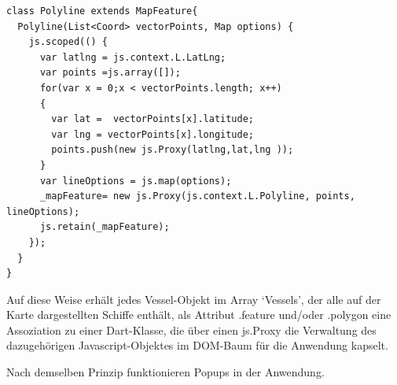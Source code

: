 \begin{lstlisting}[caption= Konstructor des Dart-Objekts Polyline, label = Constructor Polyline]
class Polyline extends MapFeature{
  Polyline(List<Coord> vectorPoints, Map options) {
    js.scoped(() {
      var latlng = js.context.L.LatLng;
      var points =js.array([]);
      for(var x = 0;x < vectorPoints.length; x++)
      {
        var lat =  vectorPoints[x].latitude;
        var lng = vectorPoints[x].longitude;
        points.push(new js.Proxy(latlng,lat,lng ));
      }
      var lineOptions = js.map(options);
      _mapFeature= new js.Proxy(js.context.L.Polyline, points, lineOptions);
      js.retain(_mapFeature);
    });
  }
}
\end{lstlisting}
Auf diese Weise erhält jedes Vessel-Objekt im Array ‘Vessels’, der alle auf der Karte dargestellten Schiffe enthält, als Attribut .feature und/oder .polygon eine Assoziation zu einer Dart-Klasse, die über einen js.Proxy die Verwaltung des dazugehörigen Javascript-Objektes im DOM-Baum für die Anwendung kapselt.

Nach demselben Prinzip funktionieren Popups in der Anwendung.

